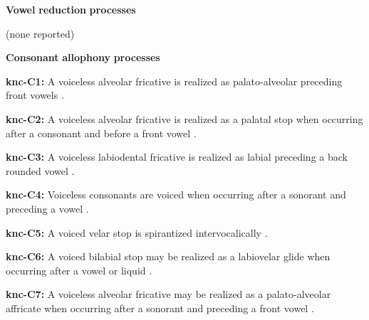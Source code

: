 \documentclass[output=paper]{langsci/langscibook}
\begin{document}
\begin{styleBody}
\textbf{Vowel} \textbf{reduction} \textbf{processes}
\end{styleBody}

\begin{styleBody}
(none reported)
\end{styleBody}

\begin{styleBody}
\textbf{Consonant} \textbf{allophony} \textbf{processes}
\end{styleBody}

\begin{styleBody}
\textbf{knc-C1:} A voiceless alveolar fricative is realized as palato-alveolar preceding front vowels \citep[20]{Cyffer1998}.
\end{styleBody}

\begin{styleBody}
\textbf{knc-C2:} A voiceless alveolar fricative is realized as a palatal stop when occurring after a consonant and before a front vowel \citep[21]{Cyffer1998}.
\end{styleBody}

\begin{styleBody}
\textbf{knc-C3:} A voiceless labiodental fricative is realized as labial preceding a back rounded vowel \citep[23]{Cyffer1998}.
\end{styleBody}

\begin{styleBody}
\textbf{knc-C4:} Voiceless consonants are voiced when occurring after a sonorant and preceding a vowel \citep[22]{Cyffer1998}.
\end{styleBody}

\begin{styleBody}
\textbf{knc-C5:} A voiced velar stop is spirantized intervocalically \citep[22]{Cyffer1998}.
\end{styleBody}

\begin{styleBody}
\textbf{knc-C6:} A voiced bilabial stop may be realized as a labiovelar glide when occurring after a vowel or liquid \citep[22]{Cyffer1998}.
\end{styleBody}

\begin{styleBody}
\textbf{knc-C7:} A voiceless alveolar fricative may be realized as a palato-alveolar affricate when occurring after a sonorant and preceding a front vowel \citep[21]{Cyffer1998}.
\end{styleBody}
\end{document}
